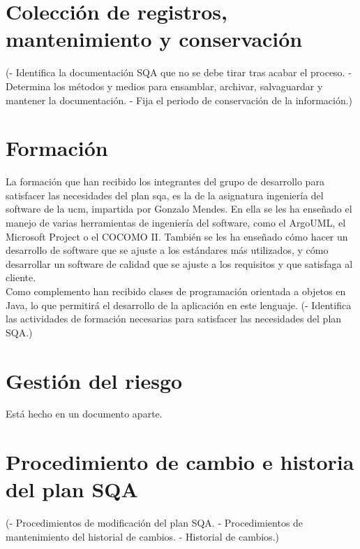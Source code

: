 \documentclass[spanish,a4paper,11pt, twoside]{report}	%
\begin{document}
\newpage
\mbox{}
\thispagestyle{empty}						%
\newpage

\chapter{ Colección de registros, mantenimiento y conservación}
	(- Identifica la documentación SQA que no se debe
	tirar tras acabar el proceso.
	- Determina los métodos y medios para ensamblar,
	archivar, salvaguardar y mantener la documentación.
	- Fija el periodo de conservación de la información.)

\newpage
\mbox{}
\thispagestyle{empty}						%
\newpage

\chapter{ \hspace{0.25cm}Formación}
	La formación que han recibido los integrantes del grupo de desarrollo para satisfacer las necesidades del plan sqa, es la de la asignatura ingeniería del software de la ucm, impartida por Gonzalo Mendes. En ella se les ha enseñado el manejo
	de varias herramientas de ingeniería del software, como el ArgoUML, el Microsoft Project o el COCOMO II. También se les ha enseñado cómo hacer un desarrollo de software que se ajuste a los estándares más utilizados,  y cómo
	 desarrollar un software de calidad que se ajuste a los requisitos y que satisfaga al cliente.\\
	
	Como complemento han recibido clases de programación orientada a objetos en Java, lo que permitirá el desarrollo de la aplicación en este lenguaje. 
	(- Identifica las actividades de formación necesarias
	para satisfacer las necesidades del plan SQA.)

\newpage
\mbox{}
\thispagestyle{empty}						%
\newpage

\chapter{ \hspace{0.25cm}Gestión del riesgo}
	Está hecho en un documento aparte.


\newpage
\mbox{}
\thispagestyle{empty}						%
\newpage

\chapter{ Procedimiento de cambio e historia del plan SQA}
	(- Procedimientos de modificación del plan SQA.
	- Procedimientos de mantenimiento del historial de
	cambios.
	- Historial de cambios.)
	


\newpage
\mbox{}
\thispagestyle{empty}						%
\newpage
\end{document}
